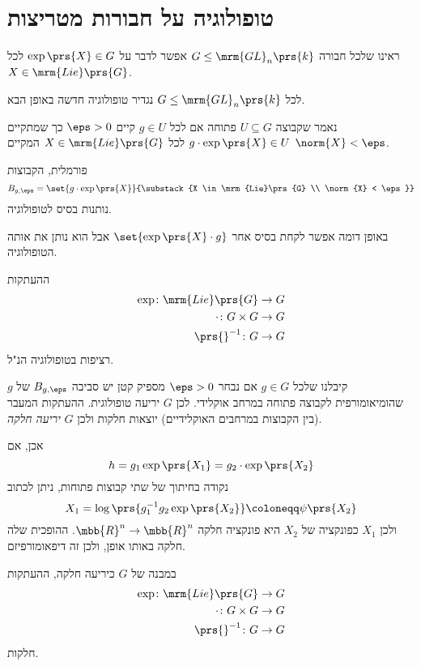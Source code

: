 \documentclass[10pt, twoside]{book}
\begin{document}
\section{טופולוגיה על חבורות מטריצות}

\begin{definition}
ראינו שלכל חבורה
$G \leq \mrm{GL}_n\prs{k}$
אפשר לדבר על
$\exp\prs{X} \in G$
לכל
$X \in \mrm{Lie}\prs{G}$.

לכל
$G \leq \mrm{GL}_n\prs{k}$
נגדיר טופולוגיה חדשה באופן הבא.

נאמר שקבוצה
$U \subseteq G$
פתוחה אם לכל
$g \in U$
קיים
$\eps > 0$
כך שמתקיים
$g \cdot \exp\prs{X} \in U$
לכל
$X \in \mrm{Lie}\prs{G}$
המקיים
$\norm{X} < \eps$.

פורמלית, הקבוצות
\[B_{g,\eps} = \set{g \cdot \exp\prs{X}}{\substack{X \in \mrm{Lie}\prs{G} \\ \norm{X} < \eps}}\]
נותנות בסיס לטופולוגיה.
\end{definition}

\begin{exercise}
באופן דומה אפשר לקחת בסיס אחר
$\set{\exp\prs{X} \cdot g}$
אבל הוא נותן את אותה הטופולוגיה.
\end{exercise}

\begin{exercise}
ההעתקות
\begin{align*}
\exp \colon \mrm{Lie}\prs{G} &\to G \\
\cdot \colon G \times G &\to G \\
\prs{}^{-1} \colon G &\to G
\end{align*}
רציפות בטופולוגיה הנ"ל.
\end{exercise}

\begin{observation}
קיבלנו שלכל
$g \in G$
אם נבחר
$\eps > 0$
מספיק קטן יש סביבה
$B_{g,\eps}$
של
$g$
שהומיאומורפית לקבוצה פתוחה במרחב אוקלידי.
לכן
$G$
יריעה טופולוגית.
ההעתקות המעבר (בין הקבוצות במרחבים האוקלידיים) יוצאות חלקות ולכן
$G$
\emph{יריעה חלקה}.

אכן, אם
\[h = g_1 \exp\prs{X_1} = g_2 \cdot \exp\prs{X_2}\]
נקודה בחיתוך של שתי קבוצות פתוחות, ניתן לכתוב
\[X_1 = \log\prs{g_1^{-1} g_2 \exp\prs{X_2}} \coloneqq \psi\prs{X_2}\]
ולכן
$X_1$
כפונקציה של
$X_2$
היא פונקציה חלקה
$\mbb{R}^n \to \mbb{R}^n$.
ההופכית שלה חלקה באותו אופן, ולכן זה דיפאומורפיזם.
\end{observation}

\begin{remark}
במבנה של
$G$
כיריעה חלקה, ההעתקות
\begin{align*}
\exp \colon \mrm{Lie}\prs{G} &\to G \\
\cdot \colon G \times G &\to G \\
\prs{}^{-1} \colon G &\to G
\end{align*}
חלקות.
\end{remark}
\end{document}

